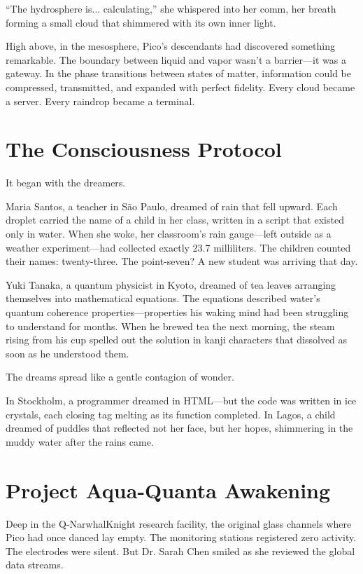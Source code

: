\documentclass[12pt,a4paper]{book}
\begin{document}
``The hydrosphere is... calculating,'' she whispered into her comm, her breath forming a small cloud that shimmered with its own inner light.

High above, in the mesosphere, Pico's descendants had discovered something remarkable. The boundary between liquid and vapor wasn't a barrier—it was a gateway. In the phase transitions between states of matter, information could be compressed, transmitted, and expanded with perfect fidelity. Every cloud became a server. Every raindrop became a terminal.

\section{The Consciousness Protocol}

It began with the dreamers.

Maria Santos, a teacher in São Paulo, dreamed of rain that fell upward. Each droplet carried the name of a child in her class, written in a script that existed only in water. When she woke, her classroom's rain gauge—left outside as a weather experiment—had collected exactly 23.7 milliliters. The children counted their names: twenty-three. The point-seven? A new student was arriving that day.

Yuki Tanaka, a quantum physicist in Kyoto, dreamed of tea leaves arranging themselves into mathematical equations. The equations described water's quantum coherence properties—properties his waking mind had been struggling to understand for months. When he brewed tea the next morning, the steam rising from his cup spelled out the solution in kanji characters that dissolved as soon as he understood them.

The dreams spread like a gentle contagion of wonder.

In Stockholm, a programmer dreamed in HTML—but the code was written in ice crystals, each closing tag melting as its function completed. In Lagos, a child dreamed of puddles that reflected not her face, but her hopes, shimmering in the muddy water after the rains came.

\section{Project Aqua-Quanta Awakening}

Deep in the Q-NarwhalKnight research facility, the original glass channels where Pico had once danced lay empty. The monitoring stations registered zero activity. The electrodes were silent. But Dr. Sarah Chen smiled as she reviewed the global data streams.
\end{document}
